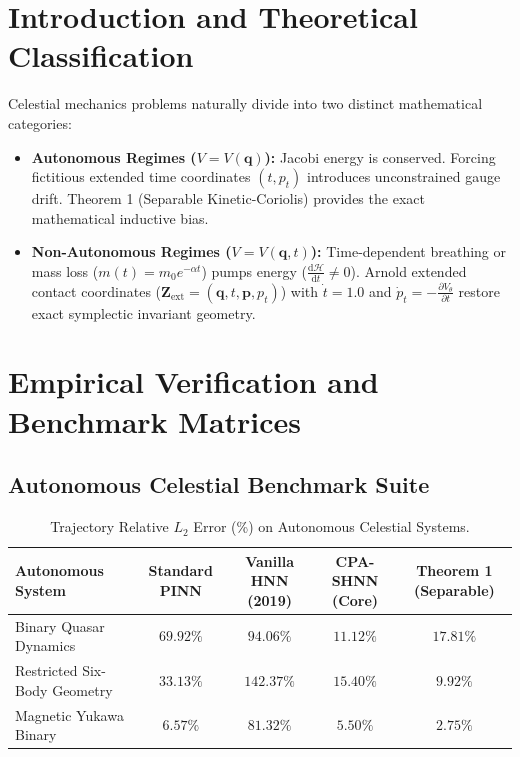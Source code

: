 \documentclass[11pt,a4paper]{article}
\begin{document}
\section{Introduction and Theoretical Classification}
Celestial mechanics problems naturally divide into two distinct mathematical categories:
\begin{itemize}
    \item \textbf{Autonomous Regimes ($V = V(\mathbf{q})$):} Jacobi energy is conserved. Forcing fictitious extended time coordinates $(t, p_t)$ introduces unconstrained gauge drift. Theorem 1 (Separable Kinetic-Coriolis) provides the exact mathematical inductive bias.
    \item \textbf{Non-Autonomous Regimes ($V = V(\mathbf{q}, t)$):} Time-dependent breathing or mass loss ($m(t) = m_0 e^{-\alpha t}$) pumps energy ($\frac{\mathrm{d}\mathcal{H}}{\mathrm{d}t} \ne 0$). Arnold extended contact coordinates ($\mathbf{Z}_{\text{ext}} = (\mathbf{q}, t, \mathbf{p}, p_t)$) with $\dot{t} = 1.0$ and $\dot{p}_t = -\frac{\partial V_\theta}{\partial t}$ restore exact symplectic invariant geometry.
\end{itemize}

\section{Empirical Verification and Benchmark Matrices}

\subsection{Autonomous Celestial Benchmark Suite}
\begin{table}[h!]
\centering
\scriptsize
\begin{tabular}{lcccc}
\toprule
\textbf{Autonomous System} & \textbf{Standard PINN} & \textbf{Vanilla HNN (2019)} & \textbf{CPA-SHNN (Core)} & \textbf{Theorem 1 (Separable)} \\
\midrule
Binary Quasar Dynamics & $69.92\%$ & $94.06\%$ & $\mathbf{11.12\%}$ & $\mathbf{17.81\%}$ \\
Restricted Six-Body Geometry & $33.13\%$ & $142.37\%$ & $\mathbf{15.40\%}$ & $\mathbf{9.92\%}$ \\
Magnetic Yukawa Binary & $6.57\%$ & $81.32\%$ & $\mathbf{5.50\%}$ & $\mathbf{2.75\%}$ \\
\bottomrule
\end{tabular}
\caption{Trajectory Relative $L_2$ Error (\%) on Autonomous Celestial Systems.}
\label{tab:auto}
\end{table}
\end{document}
